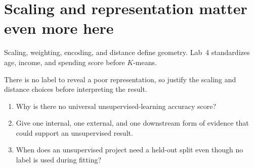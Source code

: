 \section{Scaling and representation matter even more here}

Scaling, weighting, encoding, and distance define geometry. Lab~4 standardizes age, income, and spending score before $K$-means.

\begin{keyidea}
There is no label to reveal a poor representation, so justify the scaling and distance choices before interpreting the result.
\end{keyidea}

\begin{quickcheck}
\begin{enumerate}
  \item Why is there no universal unsupervised-learning accuracy score?
  \item Give one internal, one external, and one downstream form of evidence that could support an unsupervised result.
  \item When does an unsupervised project need a held-out split even though no label is used during fitting?
\end{enumerate}
\end{quickcheck}
